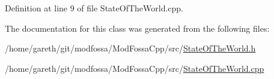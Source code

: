Definition at line 9 of file StateOfTheWorld.cpp.



The documentation for this class was generated from the following files:\begin{DoxyCompactItemize}
\item 
/home/gareth/git/modfossa/ModFossaCpp/src/\hyperlink{StateOfTheWorld_8h}{StateOfTheWorld.h}\item 
/home/gareth/git/modfossa/ModFossaCpp/src/\hyperlink{StateOfTheWorld_8cpp}{StateOfTheWorld.cpp}\end{DoxyCompactItemize}
